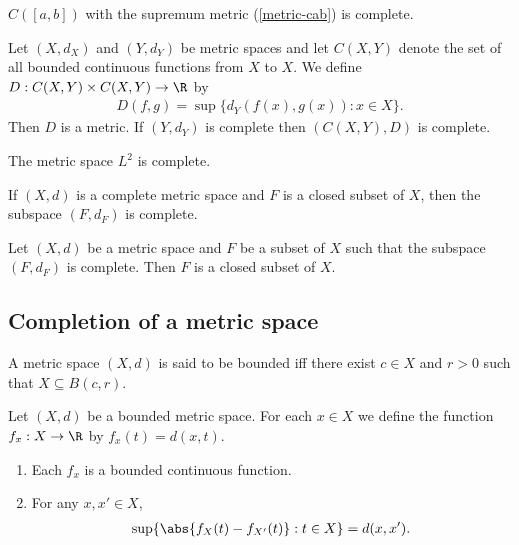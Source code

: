 \documentclass{article}
\begin{document}
\begin{proposition}[Notes 7.6]
    $C([a,b])$ with the supremum metric (\vref{metric-cab}) is complete.
\end{proposition}

\begin{proposition}[Notes 7.7]
    Let $(X,d_X)$ and $(Y,d_Y)$ be metric spaces and let $C(X,Y)$ denote the set of all 
    bounded continuous functions from $X$ to $X$. We define $D:C(X,Y)\times C(X,Y)\to\R$
    by 
    \begin{align*}
        D(f,g)=\sup\{d_Y(f(x),g(x)):x\in X\}.
    \end{align*}
    Then $D$ is a metric. If $(Y,d_Y)$ is complete then $(C(X,Y),D)$ is complete.
\end{proposition}

\begin{proposition}[Notes 7.8]
    The metric space $L^2$ is complete.
\end{proposition}

\begin{proposition}[Notes 7.10]
    If $(X,d)$ is a complete metric space and $F$ is a closed subset of $X$, then 
    the subspace $(F,d_F)$ is complete.
\end{proposition}

\begin{proposition}[Notes 7.11]
    Let $(X,d)$ be a metric space and $F$ be a subset of $X$ such that the subspace $(F,d_F)$
    is complete. Then $F$ is a closed subset of $X$.
\end{proposition}

\subsection{Completion of a metric space}

\begin{definition}
    A metric space $(X,d)$ is said to be bounded iff there exist  $c\in X$
    and $r>0$ such that $X\subseteq B(c,r)$.
\end{definition}

\begin{proposition}[Notes 7.14]
    Let $(X,d)$ be a bounded metric space. For each $x\in X$ we define the function 
    $f_x:X\to\R$ by $f_x(t)=d(x,t)$. 
    \begin{enumerate}
        \item Each $f_x$ is a bounded continuous function.
        \item For any $x,x'\in X$, \begin{align*}
            \sup\{\abs{f_X(t)-f_{X'}(t)}:t\in X\}=d(x,x').
        \end{align*}
    \end{enumerate}
\end{proposition}
\end{document}
